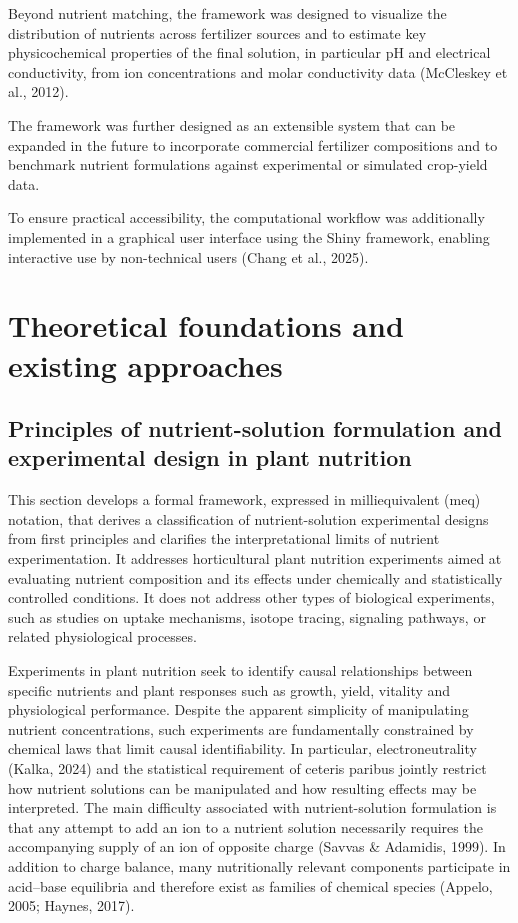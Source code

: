 \documentclass[
  letterpaper,
  DIV=11,
  numbers=noendperiod]{scrreprt}
\begin{document}
Beyond nutrient matching, the framework was designed to visualize the
distribution of nutrients across fertilizer sources and to estimate key
physicochemical properties of the final solution, in particular pH and
electrical conductivity, from ion concentrations and molar conductivity
data (McCleskey et al., 2012).

The framework was further designed as an extensible system that can be
expanded in the future to incorporate commercial fertilizer compositions
and to benchmark nutrient formulations against experimental or simulated
crop-yield data.

To ensure practical accessibility, the computational workflow was
additionally implemented in a graphical user interface using the Shiny
framework, enabling interactive use by non-technical users (Chang et
al., 2025).

\chapter{Theoretical foundations and existing
approaches}\label{theoretical-foundations-and-existing-approaches}

\section{Principles of nutrient-solution formulation and experimental
design in plant
nutrition}\label{principles-of-nutrient-solution-formulation-and-experimental-design-in-plant-nutrition}

This section develops a formal framework, expressed in milliequivalent
(meq) notation, that derives a classification of nutrient-solution
experimental designs from first principles and clarifies the
interpretational limits of nutrient experimentation. It addresses
horticultural plant nutrition experiments aimed at evaluating nutrient
composition and its effects under chemically and statistically
controlled conditions. It does not address other types of biological
experiments, such as studies on uptake mechanisms, isotope tracing,
signaling pathways, or related physiological processes.

Experiments in plant nutrition seek to identify causal relationships
between specific nutrients and plant responses such as growth, yield,
vitality and physiological performance. Despite the apparent simplicity
of manipulating nutrient concentrations, such experiments are
fundamentally constrained by chemical laws that limit causal
identifiability. In particular, electroneutrality (Kalka, 2024) and the
statistical requirement of ceteris paribus jointly restrict how nutrient
solutions can be manipulated and how resulting effects may be
interpreted. The main difficulty associated with nutrient-solution
formulation is that any attempt to add an ion to a nutrient solution
necessarily requires the accompanying supply of an ion of opposite
charge (Savvas \& Adamidis, 1999). In addition to charge balance, many
nutritionally relevant components participate in acid--base equilibria
and therefore exist as families of chemical species (Appelo, 2005;
Haynes, 2017).
\end{document}
